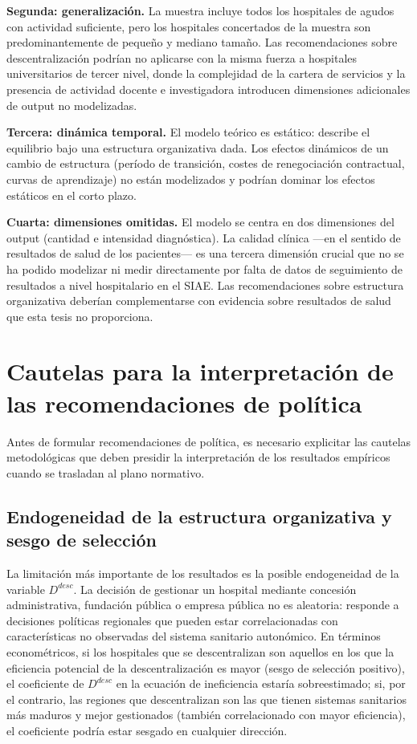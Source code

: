 \textbf{Segunda: generalización.} La muestra incluye todos los hospitales de agudos con actividad suficiente, pero los hospitales concertados de la muestra son predominantemente de pequeño y mediano tamaño. Las recomendaciones sobre descentralización podrían no aplicarse con la misma fuerza a hospitales universitarios de tercer nivel, donde la complejidad de la cartera de servicios y la presencia de actividad docente e investigadora introducen dimensiones adicionales de output no modelizadas.

\textbf{Tercera: dinámica temporal.} El modelo teórico es estático: describe el equilibrio bajo una estructura organizativa dada. Los efectos dinámicos de un cambio de estructura (período de transición, costes de renegociación contractual, curvas de aprendizaje) no están modelizados y podrían dominar los efectos estáticos en el corto plazo.

\textbf{Cuarta: dimensiones omitidas.} El modelo se centra en dos dimensiones del output (cantidad e intensidad diagnóstica). La calidad clínica ---en el sentido de resultados de salud de los pacientes--- es una tercera dimensión crucial que no se ha podido modelizar ni medir directamente por falta de datos de seguimiento de resultados a nivel hospitalario en el SIAE. Las recomendaciones sobre estructura organizativa deberían complementarse con evidencia sobre resultados de salud que esta tesis no proporciona.

\section{Cautelas para la interpretación de las recomendaciones de política}
\label{sec:cautelas_politica}

Antes de formular recomendaciones de política, es necesario explicitar las cautelas metodológicas que deben presidir la interpretación de los resultados empíricos cuando se trasladan al plano normativo.

\subsection{Endogeneidad de la estructura organizativa y sesgo de selección}

La limitación más importante de los resultados es la posible endogeneidad de la variable $D^{desc}$. La decisión de gestionar un hospital mediante concesión administrativa, fundación pública o empresa pública no es aleatoria: responde a decisiones políticas regionales que pueden estar correlacionadas con características no observadas del sistema sanitario autonómico. En términos econométricos, si los hospitales que se descentralizan son aquellos en los que la eficiencia potencial de la descentralización es mayor (sesgo de selección positivo), el coeficiente de $D^{desc}$ en la ecuación de ineficiencia estaría sobreestimado; si, por el contrario, las regiones que descentralizan son las que tienen sistemas sanitarios más maduros y mejor gestionados (también correlacionado con mayor eficiencia), el coeficiente podría estar sesgado en cualquier dirección.

